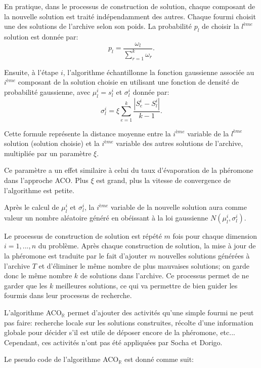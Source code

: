 En pratique, dans le processus de construction de solution, chaque composant de la nouvelle solution est traité indépendamment des autres.
Chaque fourmi choisit une des solutions de l'archive selon son poids. La probabilité $p_l$ de choisir la $l^{ème}$ solution est donnée par:
$$
p_l = \frac{\omega_l}{\sum_{r=1}^{k} \omega_r}.
$$

Ensuite, à l'étape $i$, l'algorithme échantillonne la fonction gaussienne associée au $i^{ème}$ composant de la solution choisie en utilisant une fonction
de densité de probabilité gaussienne, avec $\mu^i_l=s^i_l$ et $\sigma^i_l$ donnée par:
$$
\sigma_l^i = \xi \sum_{e=1}^{k} \frac{|S_e^i - S_l^i|}{k-1}.
$$

Cette formule représente la distance moyenne entre la $i^{ème}$ variable de la $l^{ème}$ solution
(solution choisie) et la $i^{ème}$ variable des autres solutions de l'archive,
multipliée par un paramètre $\xi$.

Ce paramètre a un effet similaire à celui du taux d'évaporation de la phéromone dans l'approche ACO. Plus $\xi$ est grand, plus la vitesse de convergence de l'algorithme est petite.

Après le calcul de $\mu^i_l$ et $\sigma^i_l$, la $i^{ème}$ variable de la nouvelle solution aura comme valeur un nombre aléatoire généré en obéissant à la loi gaussienne $N(\mu^i_l,\sigma^i_l)$.  

Le processus de construction de solution est répété $m$ fois pour chaque
dimension $i=1,...,n$ du problème. Après chaque construction de solution, la mise à jour
de la phéromone est traduite par le fait d'ajouter $m$ nouvelles solutions
générées à l'archive $T$ et d'éliminer le même nombre de plus mauvaises solutions; on garde donc le même nombre $k$ de solutions dans l'archive. Ce
processus permet de ne garder que les $k$ meilleures solutions, ce qui va
permettre de bien guider les fourmis dans leur processus de recherche.

L'algorithme ACO$_\mathbb{R}$ permet d'ajouter des activités qu'une simple
fourmi ne peut pas faire: recherche locale sur les solutions construites, récolte d'une information globale pour décider s'il est utile de déposer
encore de la phéromone, etc... Cependant, ces activités n'ont pas été appliquées par Socha et Dorigo.

Le pseudo code de l'algorithme ACO$_\mathbb{R}$ est donné comme suit:\\

